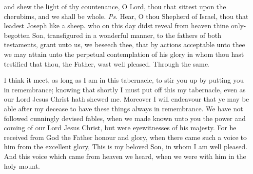 \introit
{} and shew the light of thy countenance, O Lord, thou that sittest upon the cherubims, and we shall be whole. \textit{Ps.} Hear, O thou Shepherd of Israel, thou that leadest Joseph like a sheep.
\collect
 who on this day didst reveal from heaven thine only-begotten Son, transfigured in a wonderful manner, to the fathers of both testaments, grant unto us, we beseech thee, that by actions acceptable unto thee we may attain unto the perpetual contemplation of his glory in whom thou hast testified that thou, the Father, wast well pleased. Through the same.

 I think it meet, as long as I am in this tabernacle, to stir you up by putting you in remembrance; knowing that shortly I must put off this my tabernacle, even as our Lord Jesus Christ hath shewed me. Moreover I will endeavour that ye may be able after my decease to have these things always in remembrance. We have not followed cunningly devised fables, when we made known unto you the power and coming of our Lord Jesus Christ, but were eyewitnesses of his majesty. For he received from God the Father honour and glory, when there came such a voice to him from the excellent glory, This is my beloved Son, in whom I am well pleased. And this voice which came from heaven we heard, when we were with him in the holy mount.


